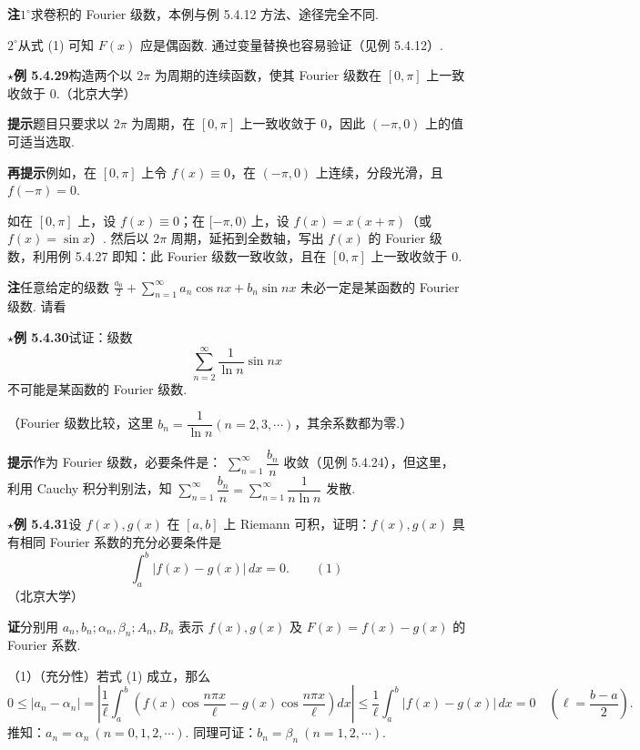 \documentclass[UTF8, 12pt, fontset=fandol, oneside]{ctexart}
\begin{document}
\noindent\textbf{注}\quad $1^\circ$\quad 求卷积的 Fourier 级数，本例与例 5.4.12 方法、途径完全不同.

$2^\circ$\quad 从式 (1) 可知 $F(x)$ 应是偶函数. 通过变量替换也容易验证（见例 5.4.12）.

\noindent\(\star\)\textbf{例 5.4.29}\quad 构造两个以 $2\pi$ 为周期的连续函数，使其 Fourier 级数在 $[0,\pi]$ 上一致收敛于 0.（北京大学）

\noindent\textbf{提示}\quad 题目只要求以 $2\pi$ 为周期，在 $[0,\pi]$ 上一致收敛于 0，因此 $(-\pi,0)$ 上的值可适当选取.

\noindent\textbf{再提示}\quad 例如，在 $[0,\pi]$ 上令 $f(x)\equiv0$，在 $(-\pi,0)$ 上连续，分段光滑，且
$f(-\pi)=0$.

如在 $[0,\pi]$ 上，设 $f(x)\equiv0$；在 $[-\pi,0)$ 上，设 $f(x)=x(x+\pi)$（或 $f(x)=\sin x$）. 然后以 $2\pi$ 周期，延拓到全数轴，写出 $f(x)$ 的 Fourier 级数，利用例 5.4.27 即知：此 Fourier 级数一致收敛，且在 $[0,\pi]$ 上一致收敛于 0.

\noindent\textbf{注}\quad 任意给定的级数
$\displaystyle\frac{a_0}{2}+\sum_{n=1}^{\infty}a_n\cos nx+b_n\sin nx$
未必一定是某函数的 Fourier 级数. 请看

\noindent\(\star\)\textbf{例 5.4.30}\quad 试证：级数
\[
  \sum_{n=2}^{\infty}\frac1{\ln n}\sin nx
\]
不可能是某函数的 Fourier 级数.

（Fourier 级数比较，这里 $b_n=\dfrac1{\ln n}(n=2,3,\cdots)$，其余系数都为零.）

\noindent\textbf{提示}\quad 作为 Fourier 级数，必要条件是：
$\displaystyle\sum_{n=1}^{\infty}\dfrac{b_n}{n}$ 收敛（见例 5.4.24），但这里，利用 Cauchy 积分判别法，知
$\displaystyle\sum_{n=1}^{\infty}\dfrac{b_n}{n}
=\sum_{n=1}^{\infty}\dfrac1{n\ln n}$ 发散.

\noindent\(\star\)\textbf{例 5.4.31}\quad 设 $f(x),g(x)$ 在 $[a,b]$ 上 Riemann 可积，证明：$f(x),g(x)$ 具有相同 Fourier 系数的充分必要条件是
\[
  \int_a^b|f(x)-g(x)|\,dx=0. \qquad(1)
\]
（北京大学）

\noindent\textbf{证}\quad 分别用 $a_n,b_n;\alpha_n,\beta_n;A_n,B_n$ 表示 $f(x),g(x)$ 及
$F(x)=f(x)-g(x)$ 的 Fourier 系数.

（1）（充分性）若式 (1) 成立，那么
\[
  0\le |a_n-\alpha_n|=
  \left|\frac1{\ell}\int_a^b\left(f(x)\cos\frac{n\pi x}{\ell}
  -g(x)\cos\frac{n\pi x}{\ell}\right)dx\right|
  \le\frac1{\ell}\int_a^b|f(x)-g(x)|\,dx=0
  \quad\left(\ell=\frac{b-a}{2}\right).
\]
推知：$a_n=\alpha_n\ (n=0,1,2,\cdots)$. 同理可证：$b_n=\beta_n\ (n=1,2,\cdots)$.
\end{document}
